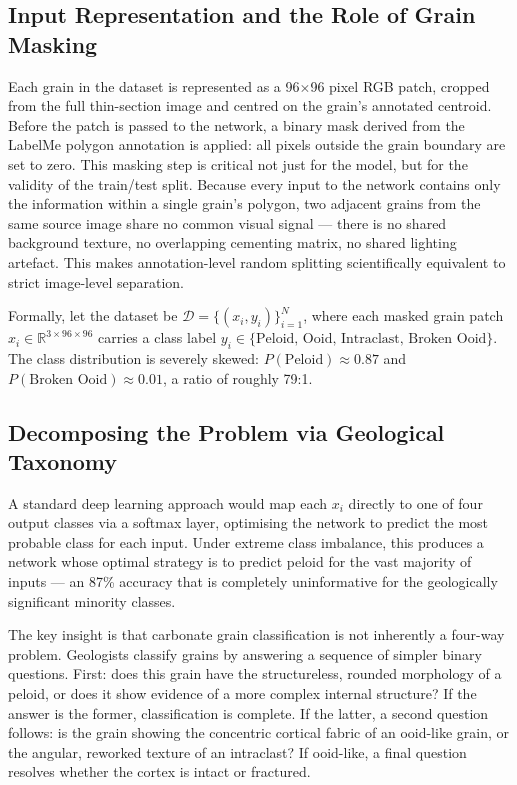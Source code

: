 \documentclass[a4paper,fleqn]{cas-dc}
\begin{document}
\subsection{Input Representation and the Role of Grain Masking}
Each grain in the dataset is represented as a 96$\times$96 pixel RGB patch, cropped from the full thin-section image and centred on the grain's annotated centroid. Before the patch is passed to the network, a binary mask derived from the LabelMe polygon annotation is applied: all pixels outside the grain boundary are set to zero. This masking step is critical not just for the model, but for the validity of the train/test split. Because every input to the network contains only the information within a single grain's polygon, two adjacent grains from the same source image share no common visual signal --- there is no shared background texture, no overlapping cementing matrix, no shared lighting artefact. This makes annotation-level random splitting scientifically equivalent to strict image-level separation.

Formally, let the dataset be $\mathcal{D} = \{(x_i, y_i)\}_{i=1}^N$, where each masked grain patch $x_i \in \mathbb{R}^{3 \times 96 \times 96}$ carries a class label $y_i \in \{\text{Peloid, Ooid, Intraclast, Broken Ooid}\}$. The class distribution is severely skewed: $P(\text{Peloid}) \approx 0.87$ and $P(\text{Broken Ooid}) \approx 0.01$, a ratio of roughly 79:1.

\subsection{Decomposing the Problem via Geological Taxonomy}
A standard deep learning approach would map each $x_i$ directly to one of four output classes via a softmax layer, optimising the network to predict the most probable class for each input. Under extreme class imbalance, this produces a network whose optimal strategy is to predict peloid for the vast majority of inputs --- an 87\% accuracy that is completely uninformative for the geologically significant minority classes.

The key insight is that carbonate grain classification is not inherently a four-way problem. Geologists classify grains by answering a sequence of simpler binary questions. First: does this grain have the structureless, rounded morphology of a peloid, or does it show evidence of a more complex internal structure? If the answer is the former, classification is complete. If the latter, a second question follows: is the grain showing the concentric cortical fabric of an ooid-like grain, or the angular, reworked texture of an intraclast? If ooid-like, a final question resolves whether the cortex is intact or fractured.
\end{document}
